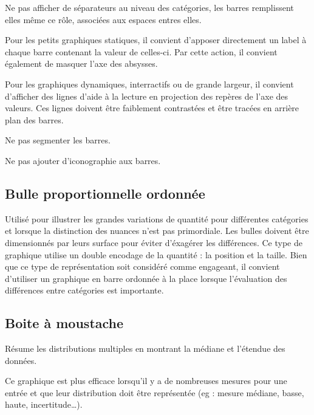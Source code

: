\documentclass[a4paper,12pt]{article}
\begin{document}
\begin{multicols}{2}
Ne pas afficher de séparateurs au niveau des catégories, les barres remplissent elles même ce rôle, associées aux espaces entres elles. \autocite{jonathanschwabishComparingCategories2021}

Pour les petits graphiques statiques, il convient d'apposer directement un label à chaque barre contenant la valeur de celles-ci. Par cette action, il convient également de masquer l'axe des absysses. \autocite{jonathanschwabishComparingCategories2021}

Pour les graphiques dynamiques, interractifs ou de grande largeur, il convient d'afficher des lignes d'aide à la lecture en projection des repères de l'axe des valeurs. Ces lignes doivent être faiblement contrastées et être tracées en arrière plan des barres. \autocite{jonathanschwabishComparingCategories2021}

Ne pas segmenter les barres. \autocite{jonathanschwabishComparingCategories2021}

Ne pas ajouter d'iconographie aux barres. \autocite{tranDiscoveringAccessibleData2024}
\subsection*{Bulle proportionnelle ordonnée}
\label{sec:orgaf8f164}
Utilisé pour illustrer les grandes variations de quantité pour différentes catégories et lorsque la distinction des nuances n'est pas primordiale. Les bulles doivent être dimensionnés par leurs surface pour éviter d'éxagérer les différences. \autocite{jonathanschwabishComparingCategories2021} Ce type de graphique utilise un double encodage de la quantité : la position et la taille. \autocite{wilkeVisualizingAssociationsTwo2019} Bien que ce type de représentation soit considéré comme engageant, il convient d'utiliser un graphique en barre ordonnée à la place lorsque l'évaluation des différences entre catégories est importante. \autocite{jonathanschwabishComparingCategories2021}
\subsection*{Boite à moustache}
\label{sec:org8b6ff46}
Résume les distributions multiples en montrant la médiane et l'étendue des données. \autocite{alansmithLexiqueVisuel}

Ce graphique est plus efficace lorsqu'il y a de nombreuses mesures pour une entrée et que leur distribution doit être représentée (eg : mesure médiane, basse, haute, incertitude\ldots{}). \autocite{mikeyiHowChooseRight2020}


\end{multicols}
\end{document}
